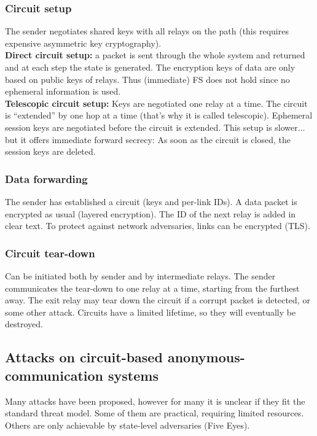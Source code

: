 \documentclass[11pt,oneside,a4paper]{article}
\begin{document}
\subsubsection{Circuit setup}

The sender negotiates shared keys with all relays on the path (this requires expensive asymmetric key cryptography).\\
\textbf{Direct circuit setup:} a packet is sent through the whole system and returned and at each step the state is generated. The encryption keys of data are only based on public keys of relays. Thus (immediate) FS does not hold since no ephemeral information is used.\\
\textbf{Telescopic circuit setup:} Keys are negotiated one relay at a time. The circuit is “extended” by one hop at a time (that’s why it is called telescopic). Ephemeral session keys are negotiated before the circuit is extended. This setup is slower... but it offers immediate forward secrecy: As soon as the circuit is closed, the session keys are deleted.

\subsubsection{Data forwarding}

The sender has established a circuit (keys and per-link IDs). A data packet is encrypted as usual (layered encryption). The ID of the next relay is added in clear text. To protect against network adversaries, links can be encrypted (TLS).

\subsubsection{Circuit tear-down}

Can be initiated both by sender and by intermediate relays. The sender communicates the tear-down to one relay at a time, starting from the furthest away. The exit relay may tear down the circuit if a corrupt packet is detected, or some other attack. Circuits have a limited lifetime, so they will eventually be destroyed.

\subsection{Attacks on circuit-based anonymous-communication systems}

Many attacks have been proposed, however for many it is unclear if they fit the standard threat model. Some of them are practical, requiring limited resources. Others are only achievable by state-level adversaries (Five Eyes).
\end{document}
